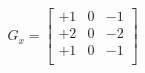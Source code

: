 \documentclass[10pt]{article}
\begin{document}
\begin{align*}G_x = \begin{bmatrix}
+1 & 0 & -1\\
+2 & 0 & -2\\
+1 & 0 & -1\\
\end{bmatrix}\end{align*}
\end{document}
